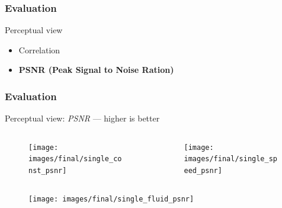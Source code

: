 \documentclass[18pt, xcolor=table]{beamer}
\begin{document}
\begin{frame}[t]
  \frametitle{Evaluation}
  \large{Perceptual view}
  \begin{itemize}
  \item Correlation
  \item \textbf{PSNR (Peak Signal to Noise Ration)}
  \end{itemize}
\end{frame}

\begin{frame}[t]
  \frametitle{Evaluation}
  \large{Perceptual view:} \textit{PSNR} --- higher is better
  \vspace{-0.5cm}
  \begin{columns}[t]
    \begin{column}{0.5\textwidth}
      \begin{center}
        \begin{figure}[htb]
          \texttt{[image: images/final/single\_const\_psnr]}
        \end{figure}
      \end{center}
    \end{column}
    \begin{column}{0.5\textwidth}
      \begin{center}
        \begin{figure}[htb]
          \texttt{[image: images/final/single\_speed\_psnr]}
        \end{figure}
      \end{center}
    \end{column}
  \end{columns}
  \begin{center}
    \begin{figure}[htb]
      \texttt{[image: images/final/single\_fluid\_psnr]}
    \end{figure}
  \end{center}
\end{frame}
\end{document}
